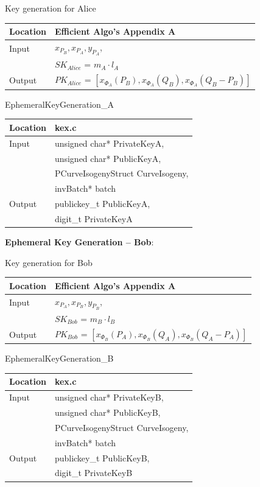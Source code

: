 	\parbox[t]{.35\linewidth}{
	\centering
	Key generation for Alice
	\begin{tabular}{@{}ll@{}}
		\toprule
		Location & Efficient Algo's Appendix A \\
		\midrule
		Input & $x_{P_{B}}, x_{P_{A}}, y_{P_{A}}$,\\
		& $SK_{Alice}$ = $m_{A} \cdot l_{A}$\\
		\midrule
		Output & $PK_{Alice}$ = $[x_{\Phi_{A}}(P_{B}), x_{\Phi_{A}}(Q_{B}), x_{\Phi_{A}}(Q_{B} - P_{B})]$\\
		\bottomrule
	\end{tabular}}
	\hfill
	\parbox[t]{.35\linewidth}{
	\centering
	EphemeralKeyGeneration\_A
	\begin{tabular}{@{}ll@{}}
		\toprule
		Location & kex.c \\
		\midrule
		Input & unsigned char* PrivateKeyA,\\
		& unsigned char* PublicKeyA,\\
		& PCurveIsogenyStruct CurveIsogeny,\\
		& invBatch* batch\\
		\midrule
		Output & publickey\_t PublicKeyA,\\
		& digit\_t PrivateKeyA\\
		\bottomrule
	\end{tabular}}

\textbf{Ephemeral Key Generation -- Bob}:

	\parbox[t]{.35\linewidth}{
	\centering
	Key generation for Bob
	\begin{tabular}{@{}ll@{}}
		\toprule
		Location & Efficient Algo's Appendix A \\
		\midrule
		Input & $x_{P_{A}}, x_{P_{B}}, y_{P_{B}}$,\\
		& $SK_{Bob}$ = $m_{B} \cdot l_{B}$\\
		\midrule
		Output & $PK_{Bob}$ = $[x_{\Phi_{B}}(P_{A}), x_{\Phi_{B}}(Q_{A}), x_{\Phi_{B}}(Q_{A} - P_{A})]$\\
		\bottomrule
	\end{tabular}}
	\hfill
	\parbox[t]{.35\linewidth}{
	\centering
	EphemeralKeyGeneration\_B
	\begin{tabular}{@{}ll@{}}
		\toprule
		Location & kex.c \\
		\midrule
		Input & unsigned char* PrivateKeyB,\\
		& unsigned char* PublicKeyB,\\
		& PCurveIsogenyStruct CurveIsogeny,\\
		& invBatch* batch\\
		\midrule
		Output & publickey\_t PublicKeyB,\\
		& digit\_t PrivateKeyB\\
		\bottomrule
	\end{tabular}}

